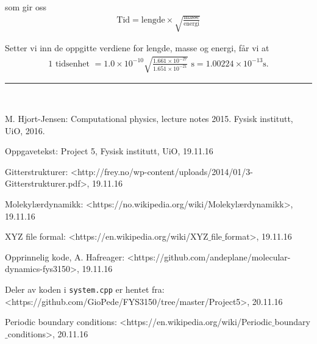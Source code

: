\documentclass[paper=a4, fontsize=11pt]{scrartcl} %
\numberwithin{equation}{section} %
\numberwithin{figure}{section} %
\numberwithin{table}{section} %
\newcommand{\horrule}[1]{\rule{\linewidth}{#1}} %
\begin{document}
som gir oss 
\begin{align}
\text{Tid} = \text{lengde} \times \sqrt{\frac{\text{masse}}{\text{energi}}}
\end{align}

Setter vi inn de oppgitte verdiene for lengde, masse og energi, får vi at
\begin{align}
\text{1 tidsenhet } = 1.0 \times 10^{-10}\sqrt{\frac{1.661\times 10^{-27}}{1.651\times 10^{-21}}} \text{ s} = 1.00224\times 10^{-13}\mathrm{s}.
\end{align}

\horrule{2pt} \\[0.5cm] %


\begin{thebibliography}{9}  
    
\bibitem{}
   M. Hjort-Jensen: Computational physics, lecture notes 2015. Fysisk institutt, UiO, 2016.

\bibitem{}
   Oppgavetekst: Project 5, Fysisk institutt, UiO, 19.11.16
   
\bibitem{}
 Gitterstrukturer: <http://frey.no/wp-content/uploads/2014/01/3-Gitterstrukturer.pdf>, 19.11.16  
 
 \bibitem{}
  Molekylærdynamikk: <https://no.wikipedia.org/wiki/Molekyl$æ$rdynamikk>, 19.11.16
  
\bibitem{}
 XYZ file formal: <https://en.wikipedia.org/wiki/XYZ$\_$file$\_$format>, 19.11.16
 
 \bibitem{}
 Opprinnelig kode, A. Hafreager: <https://github.com/andeplane/molecular-dynamics-fys3150>, 19.11.16
  
\bibitem{}
  Deler av koden i \texttt{system.cpp} er hentet fra: <https://github.com/GioPede/FYS3150/tree/master/Project5>,
  20.11.16
  
 \bibitem{}
 Periodic boundary conditions: <https://en.wikipedia.org/wiki/Periodic$\_$boundary$\_$conditions>, 20.11.16

   
\end{thebibliography}
\end{document}
